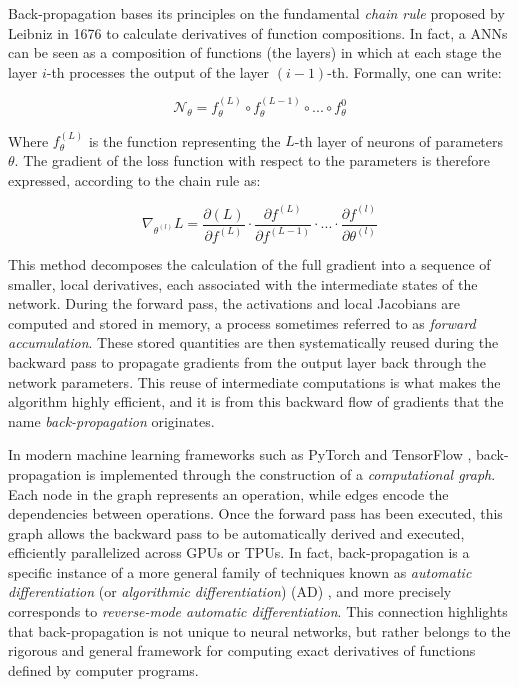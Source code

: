 Back-propagation bases its principles on the fundamental \textit{chain rule} proposed by Leibniz in 1676 to calculate 
derivatives of function compositions. In fact, a ANNs can be seen as a composition of functions (the layers) in which 
at each stage the layer $i$-th processes the output of the layer $(i-1)$-th. Formally, one can write: 

\begin{equation}
    \mathcal{N}_{\theta} = f_\theta^{(L)} \circ f_\theta^{(L-1)} \circ ... \circ f_\theta^{0}
    \label{eq:composition}
\end{equation}

Where $f_\theta^{(L)}$ is the function representing the $L$-th layer of neurons of parameters $\theta$. The gradient 
of the loss function with respect to the parameters is therefore expressed, according to the chain rule as: 

\begin{equation}
    \nabla_{\theta^{(l)}} L  = \frac{\partial{(L)}}{\partial{f^{(L)}}} \cdot \frac{\partial{f^{(L)}}}{\partial{f^{(L-1)}}} 
    \cdot ... \cdot \frac{\partial{f^{(l)}}}{\partial{\theta^{(l)}}}
    \label{eq:chain_rule}
\end{equation}

This method decomposes the calculation of the full gradient into a sequence of smaller, local derivatives, each 
associated with the intermediate states of the network. During the forward pass, the activations and local 
Jacobians are computed and stored in memory, a process sometimes referred to as \textit{forward accumulation}. 
These stored quantities are then systematically reused during the backward pass to propagate gradients from the 
output layer back through the network parameters. This reuse of intermediate computations is what makes the 
algorithm highly efficient, and it is from this backward flow of gradients that the name \textit{back-propagation} 
originates.  

In modern machine learning frameworks such as PyTorch \cite{paszke2019pytorch} and TensorFlow 
\cite{abadi2016tensorflow}, back-propagation is implemented through the construction of a 
\textit{computational graph}. Each node in the graph represents an operation, while edges encode the dependencies 
between operations. Once the forward pass has been executed, this graph allows the backward pass to be automatically 
derived and executed, efficiently parallelized across GPUs or TPUs. In fact, back-propagation is a specific instance 
of a more general family of techniques known as \textit{automatic differentiation} (or \textit{algorithmic 
differentiation}) (AD) \cite{Griewank2000EvaluatingD, baydin2018}, and more precisely corresponds to 
\textit{reverse-mode automatic differentiation}. This connection highlights that back-propagation is not 
unique to neural networks, but rather belongs to the rigorous and general framework for computing exact 
derivatives of functions defined by computer programs.  

